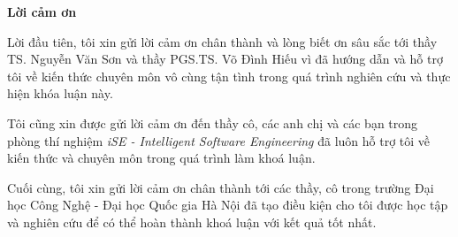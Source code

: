 \begin{center}
\textbf{\large{Lời cảm ơn}	}
\end{center}
Lời đầu tiên, tôi xin gửi lời cảm ơn chân thành và lòng biết ơn sâu sắc tới thầy TS. Nguyễn Văn Sơn và thầy PGS.TS. Võ Đình Hiếu vì đã hướng dẫn và
hỗ trợ tôi về kiến thức chuyên môn vô cùng tận tình trong quá trình nghiên
cứu và thực hiện khóa luận này.

Tôi cũng xin được gửi lời cảm ơn đến thầy cô, các anh chị và các bạn trong phòng
thí nghiệm \textit{iSE - Intelligent Software Engineering} đã luôn hỗ trợ tôi về kiến thức
và chuyên môn trong quá trình làm khoá luận.

Cuối cùng, tôi xin gửi lời cảm ơn chân thành tới các thầy, cô trong trường Đại học
Công Nghệ - Đại học Quốc gia Hà Nội đã tạo điều kiện cho tôi được học tập và
nghiên cứu để có thể hoàn thành khoá luận với kết quả tốt nhất.